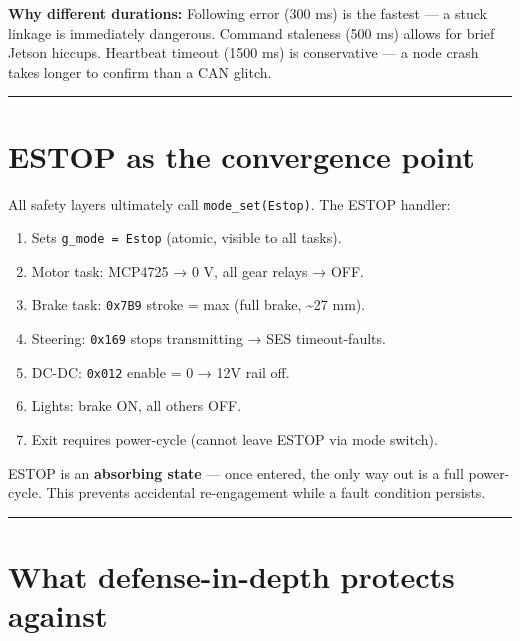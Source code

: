 \documentclass[12pt,a4paper,oneside]{report}
\providecommand{\tightlist}{\setlength{\itemsep}{0pt}\setlength{\parskip}{0pt}}
\begin{document}
\textbf{Why different durations:} Following error (300 ms) is the fastest --- a
stuck linkage is immediately dangerous. Command staleness (500 ms) allows for
brief Jetson hiccups. Heartbeat timeout (1500 ms) is conservative --- a node
crash takes longer to confirm than a CAN glitch.

\begin{center}\rule{0.5\linewidth}{0.5pt}\end{center}

\section{ESTOP as the convergence point}\label{estop-as-the-convergence-point}

All safety layers ultimately call \texttt{mode\_set(Estop)}. The ESTOP handler:

\begin{enumerate}
\def\labelenumi{\arabic{enumi}.}
\tightlist
\item
  Sets \texttt{g\_mode\ =\ Estop} (atomic, visible to all tasks).
\item
  Motor task: MCP4725 → 0 V, all gear relays → OFF.
\item
  Brake task: \texttt{0x7B9} stroke = max (full brake, \textasciitilde27 mm).
\item
  Steering: \texttt{0x169} stops transmitting → SES timeout-faults.
\item
  DC-DC: \texttt{0x012} enable = 0 → 12V rail off.
\item
  Lights: brake ON, all others OFF.
\item
  Exit requires power-cycle (cannot leave ESTOP via mode switch).
\end{enumerate}

ESTOP is an \textbf{absorbing state} --- once entered, the only way out is a
full power-cycle. This prevents accidental re-engagement while a fault condition
persists.

\begin{center}\rule{0.5\linewidth}{0.5pt}\end{center}

\section{What defense-in-depth protects
against}\label{what-defense-in-depth-protects-against}
\end{document}
